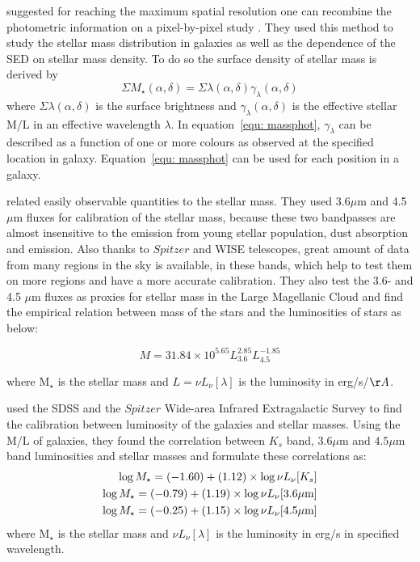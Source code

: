 \cite{Zibetti08} suggested for reaching the maximum spatial resolution one can recombine the photometric information on a pixel-by-pixel study \citep{Conti03}. They used this method to study the stellar mass distribution in galaxies as well as the dependence of the SED on stellar mass density. To do so the surface density of stellar mass is derived by 
\begin{equation}
\label{equ: massphot}
\Sigma M_\star (\alpha, \delta) = \Sigma \lambda(\alpha, \delta) \gamma_{\lambda}(\alpha, \delta)
\end{equation}
where $\Sigma \lambda(\alpha, \delta)$ is the surface brightness and $\gamma_{\lambda}(\alpha, \delta)$ is the effective stellar M/L in an effective wavelength $\lambda$. In equation~\ref{equ: massphot},  $\gamma_{\lambda}$ can be described as a function of one or more colours as observed at the specified location in galaxy. Equation~\ref{equ: massphot} can be used for each position in a galaxy.


\cite{Eskew12} related easily observable quantities to the stellar mass. They used 3.6$\mu$m and 4.5$\mu$m fluxes  for calibration of the stellar mass, because these two bandpasses are almost insensitive to the emission from young stellar population, dust absorption and emission. Also thanks to $Spitzer$ and WISE \citep{Wright10} telescopes, great amount of data from many regions in the sky is available, in these bands, which help to test them on more regions and have a more accurate calibration. They also test the 3.6- and 4.5 $\mu$m fluxes as proxies for stellar mass in the Large Magellanic Cloud and find the empirical relation between mass of the stars and the luminosities of stars as below:

\begin{equation}
\label{equ:eskew}
M = 31.84 \times 10^{5.65} L_{3.6}^{2.85} L_{4.5}^{-1.85}
\end{equation}

where M$_{\star}$ is the stellar mass and $L = \nu L_{\nu}[\lambda]$ is the luminosity in erg/s/$\AA$.
 
\cite{Zhu10} used the SDSS and the $Spitzer$ Wide-area Infrared Extragalactic Survey \citep[SWIRE;][] {Lonsdale03} to find the calibration between luminosity of the galaxies and stellar masses. Using the M/L of galaxies, they found the correlation between $K_s$ band, $3.6 \mu$m and $4.5 \mu$m band luminosities and stellar masses and formulate these correlations as:
\begin{align}
\label{equ: zhu1}
\log M_{\star} = (-1.60 ) + (1.12)\times \log \nu L_{\nu}[K_s]\\
\log M_{\star} = (-0.79) + (1.19)\times \log \nu L_{\nu}[3.6\mu \rm m]\\
\label{equ: zhu3}
\log M_{\star} = (-0.25) + (1.15)\times \log \nu L_{\nu}[4.5\mu \rm m] 
\end{align}
where M$_{\star}$ is the stellar mass and $ \nu L_{\nu}[\lambda]$ is the luminosity in erg/s in specified wavelength. 

